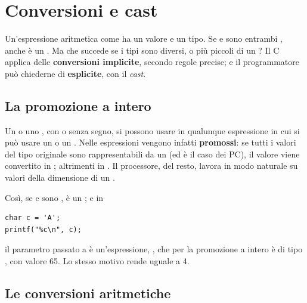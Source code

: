 
\section{Conversioni e cast}

Un'espressione aritmetica come  ha un valore e un tipo. Se
 e  sono entrambi , anche  è un
. Ma che succede se i tipi sono diversi, o più piccoli di un
? Il C applica delle \textbf{conversioni implicite}, secondo regole
precise; e il programmatore può chiederne di \textbf{esplicite}, con il
\textit{cast}.

\subsection{La promozione a intero}

Un  o uno , con o senza segno, si possono usare in
qualunque espressione in cui si può usare un  o un
. Nelle espressioni vengono infatti \textbf{promossi}:
se tutti i valori del tipo originale sono rappresentabili da un 
(ed è il caso dei PC), il valore viene convertito in ; altrimenti
in . Il processore, del resto, lavora in modo naturale su
valori della dimensione di un .

Così, se  e  sono ,  è un
; e in

\begin{lstlisting}[style=c]
char c = 'A';
printf("%c\n", c);
\end{lstlisting}

il parametro passato a  è un'espressione, , che per la
promozione a intero è di tipo , con valore 65. Lo stesso motivo
rende  uguale a 4.

\subsection{Le conversioni aritmetiche}

